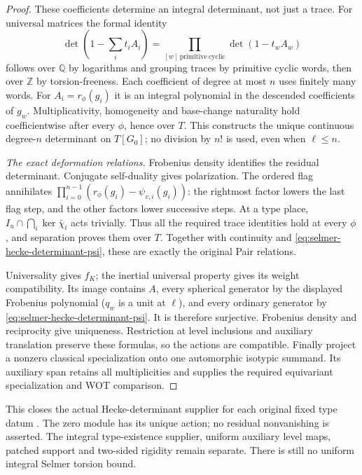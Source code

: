 \begin{proof}
These coefficients determine an integral determinant, not just a
trace.  For universal matrices the formal identity
\[
 \det\left(1-\sum_i t_iA_i\right)
       =\prod_{[w]\ \mathrm{primitive\ cyclic}}\det(1-t_wA_w)
\]
follows over \(\mathbb Q\) by logarithms and grouping traces by
primitive cyclic words, then over \(\mathbb Z\) by torsion-freeness.
Each coefficient of degree at most \(n\) uses finitely many words.
For \(A_i=r_\phi(g_i)\) it is an integral polynomial in the
descended coefficients of \(g_w\).  Multiplicativity, homogeneity
and base-change naturality hold coefficientwise after every
\(\phi\), hence over \(T\).  This constructs the unique continuous
degree-\(n\) determinant on \(T[G_0]\); no division by \(n!\) is
used, even when \(\ell\le n\).

\emph{The exact deformation relations.}
Frobenius density identifies the residual determinant.
Conjugate self-duality gives polarization.  The ordered flag
annihilates
\(\prod_{i=0}^{n-1}(r_\phi(g_i)-\psi_{v,i}(g_i))\):
the rightmost factor lowers the last flag step, and the other
factors lower successive steps.  At a type place,
\(I_u\cap\bigcap_i\ker\bar\chi_i\) acts trivially.  Thus all the
required trace identities hold at every \(\phi\), and separation
proves them over \(T\).  Together with continuity and
\eqref{eq:selmer-hecke-determinant-psi}, these are exactly the
original Pair relations.

Universality gives \(f_K\); the inertial universal property gives
its weight compatibility.  Its image contains \(A\), every
spherical generator by the displayed Frobenius polynomial
(\(q_w\) is a unit at \(\ell\)), and every ordinary generator by
\eqref{eq:selmer-hecke-determinant-psi}.  It is therefore
surjective.  Frobenius density and reciprocity give uniqueness.
Restriction at level inclusions and auxiliary translation
preserve these formulas, so the actions are compatible.
Finally project a nonzero classical specialization onto one
automorphic isotypic summand.  Its auxiliary span retains all
multiplicities and supplies the required equivariant
specialization and WOT comparison.
\end{proof}

This closes the actual Hecke-determinant supplier for each original
fixed type datum \cite{SelmerHeckeDetSource}.  The zero module has
its unique action; no residual nonvanishing is asserted.
The integral type-existence supplier, uniform auxiliary level
maps, patched support and two-sided rigidity remain separate.
There is still no uniform integral Selmer torsion bound.
